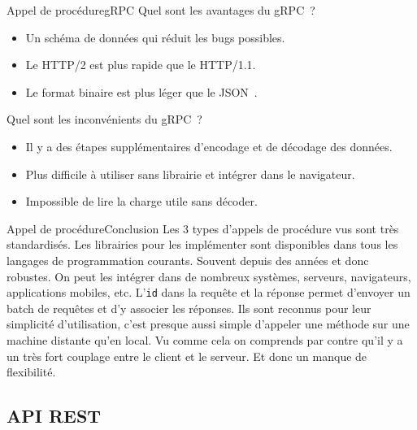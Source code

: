 \documentclass{beamer}
\begin{document}
    \begin{frame}{Appel de procédure}{gRPC}
        Quel sont les avantages du gRPC~?
        \pause
        \bigbreak
        \begin{itemize}
            \item Un schéma de données qui réduit les bugs possibles.
            \item Le HTTP/2 est plus rapide que le HTTP/1.1.
            \item Le format binaire est plus léger que le JSON~.
        \end{itemize}
        \bigbreak
        Quel sont les inconvénients du gRPC~?
        \pause
        \bigbreak
        \begin{itemize}
            \item Il y a des étapes supplémentaires d'encodage et de décodage des données.
            \item Plus difficile à utiliser sans librairie et intégrer dans le navigateur.
            \item Impossible de lire la charge utile sans décoder.
        \end{itemize}
    \end{frame}

    \begin{frame}{Appel de procédure}{Conclusion}
        Les 3 types d'appels de procédure vus sont très standardisés.
        Les librairies pour les implémenter sont disponibles dans tous les langages de programmation courants.
        Souvent depuis des années et donc robustes.
        \bigbreak
        On peut les intégrer dans de nombreux systèmes, serveurs, navigateurs, applications mobiles, etc.
        \bigbreak
        L'\lstinline{id} dans la requête et la réponse permet d'envoyer un batch de requêtes et d'y associer les réponses.
        \bigbreak
        Ils sont reconnus pour leur simplicité d'utilisation, c'est presque aussi simple d'appeler une méthode sur une machine distante qu'en local.
        Vu comme cela on comprends par contre qu'il y a un très fort couplage entre le client et le serveur.
        Et donc un manque de flexibilité.
    \end{frame}

    \subsection{API REST}\label{subsec:api-rest}
\end{document}

